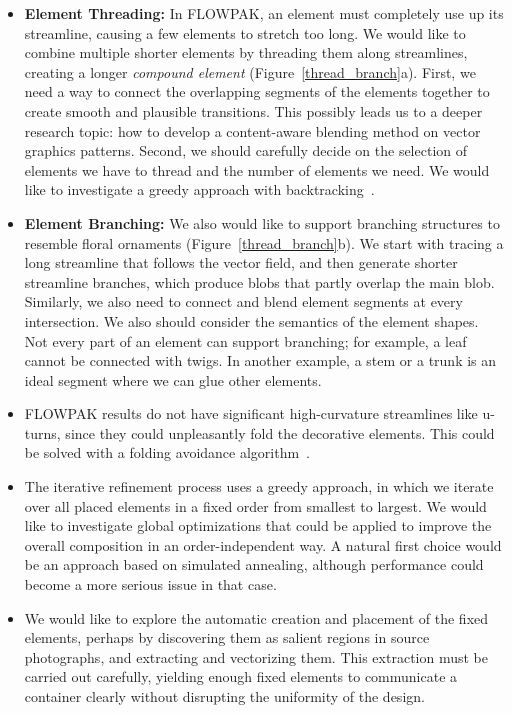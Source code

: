 \begin{itemize}

\item 
\newtext
{
\textbf{Element Threading:}
In FLOWPAK, an element must completely use up its streamline, 
causing a few elements to stretch too long.
We would like to combine multiple shorter elements
by threading them along streamlines, creating
a longer \textit{compound element} (Figure~\ref{thread_branch}a).
First, we need a way to connect the overlapping segments of the elements together
to create smooth and plausible transitions.
This possibly leads us to a deeper research topic:
how to develop a content-aware blending method on vector graphics patterns.
Second, we should carefully decide on the selection of elements we have to thread and
the number of elements we need. We would like to investigate a greedy approach
with backtracking~\cite{Kim2002}.
}

\item 
\newtext
{
\textbf{Element Branching:}
We also would like to support
branching structures to resemble floral ornaments (Figure~\ref{thread_branch}b).
We start with tracing a long streamline that follows the vector field,
and then generate shorter streamline branches,
which produce blobs that partly overlap the main blob.
Similarly, we also need to connect and blend element segments
at every intersection. 
We also should consider the semantics of the element shapes.
Not every part of an element can support branching; for example, a leaf
cannot be connected with twigs.
In another example, a stem or a trunk is an ideal segment where we can glue other elements.
}


\item {}
FLOWPAK results do not have significant high-curvature streamlines like u-turns, 
since they could unpleasantly fold the decorative elements. This could be solved with a folding avoidance algorithm~\cite{Asente2010}.

\item {}
The iterative refinement process uses a greedy approach, in which we 
iterate over all placed elements in a fixed order from smallest to largest.
We would like to investigate global optimizations
that could be applied to improve the overall composition in an 
order-independent way.  A natural first choice would be an approach based
on simulated annealing, although performance could become a more serious
issue in that case.

\item {}
We would like to explore the automatic creation and placement of 
the fixed elements, perhaps by discovering them as salient regions 
in source photographs, and extracting and vectorizing them.  This 
extraction must be carried out carefully, yielding enough fixed elements
to communicate a container clearly without disrupting the uniformity of
the design.

\end{itemize}

